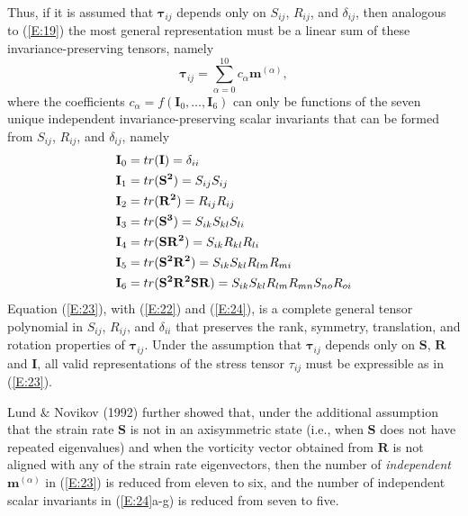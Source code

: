 Thus, if it is assumed that $\mathbf{\tau}_{ij}$  depends only on $S_{ij}$, $R_{ij}$, and $\delta_{ij}$, then analogous to (\ref{E:19}) the most general representation must be a linear sum of these invariance-preserving tensors, namely
%
\begin{equation}
\label{E:23}
	\mathbf{\tau}_{ij} = \sum_{\alpha=0}^{10} c_{\alpha} \mathbf{m}^{(\alpha)},
\end{equation}
%
%   
where the coefficients $c_{\alpha} = f(\mathbf{I}_0, \ldots, \mathbf{I}_6)$  can only be functions of the seven unique independent invariance-preserving scalar invariants that can be formed from $S_{ij}$, $R_{ij}$, and $\delta_{ij}$, namely
%
\begin{subequations}
\label{E:24} \vspace{-0.33in}
\begin{align}
 	\mathbf{I}_{0} &= tr(\mathbf{I})   = \delta_{ii} \\
	\mathbf{I}_{1} &= tr(\mathbf{S^2}) = S_{ij}S_{ij} \\
	\mathbf{I}_{2} &= tr(\mathbf{R^2}) = R_{ij}R_{ij} \\
	\mathbf{I}_{3} &= tr(\mathbf{S^3}) = S_{ik}S_{kl}S_{li} \\
	\mathbf{I}_{4} &= tr(\mathbf{SR^2}) = S_{ik}R_{kl}R_{li} \\ 
	\mathbf{I}_{5} &= tr(\mathbf{S^2R^2}) = S_{ik}S_{kl}R_{lm}R_{mi} \\ 
	\mathbf{I}_{6} &= tr(\mathbf{S^2R^2SR}) = S_{ik}S_{kl}R_{lm}R_{mn}S_{no}R_{oi} 
\end{align}
\end{subequations}
%
%    
Equation (\ref{E:23}), with (\ref{E:22}) and (\ref{E:24}), is a complete general tensor polynomial in $S_{ij}$, $R_{ij}$, and $\delta_{ii}$ that preserves the rank, symmetry, translation, and rotation properties of $\mathbf{\tau}_{ij}$.  Under the assumption that $\mathbf{\tau}_{ij}$  depends only on $\mathbf{S}$, $\mathbf{R}$ and $\mathbf{I}$, all valid representations of the stress tensor $\tau_{ij}$  must be expressible as in (\ref{E:23}).

Lund $\&$ Novikov (1992) further showed that, under the additional assumption that the strain rate $\mathbf{S}$ is not in an axisymmetric state (i.e., when $\mathbf{S}$ does not have repeated eigenvalues) and when the vorticity vector obtained from $\mathbf{R}$ is not aligned with any of the strain rate eigenvectors, then the number of \textit{independent} $\mathbf{m}^{(\alpha)}$ in (\ref{E:23}) is reduced from eleven to six, and the number of independent scalar invariants in (\ref{E:24}a-g) is reduced from seven to five. 


